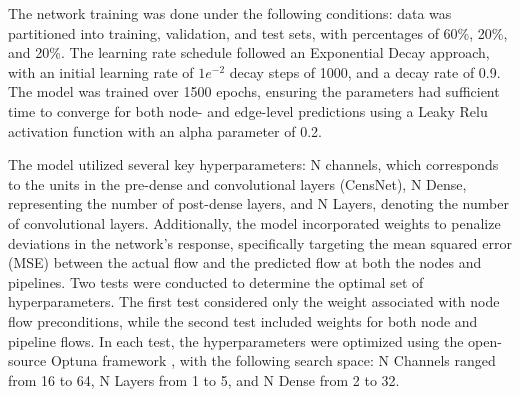 The network training was done under the following conditions: data was partitioned into training, validation, and test sets, with percentages of 60\%, 20\%, and 20\%. The learning rate schedule followed an Exponential Decay approach, with an initial learning rate of $1e^{-2}$ decay steps of 1000, and a decay rate of 0.9. The model was trained over 1500 epochs, ensuring the parameters had sufficient time to converge for both node- and edge-level predictions using a Leaky Relu activation function with an alpha parameter of 0.2.


The model utilized several key hyperparameters: N channels, which corresponds to the units in the pre-dense and convolutional layers (CensNet), N Dense, representing the number of post-dense layers, and N Layers, denoting the number of convolutional layers. 
Additionally, the model incorporated weights to penalize deviations in the network's response, specifically targeting the mean squared error (MSE) between the actual flow and the predicted flow at both the nodes and pipelines. Two tests were conducted to determine the optimal set of hyperparameters. The first test considered only the weight associated with node flow preconditions, while the second test included weights for both node and pipeline flows. In each test, the hyperparameters were optimized using the open-source Optuna framework \cite{optuna_2019}, with the following search space: N Channels ranged from 16 to 64, N Layers from 1 to 5, and N Dense from 2 to 32.





